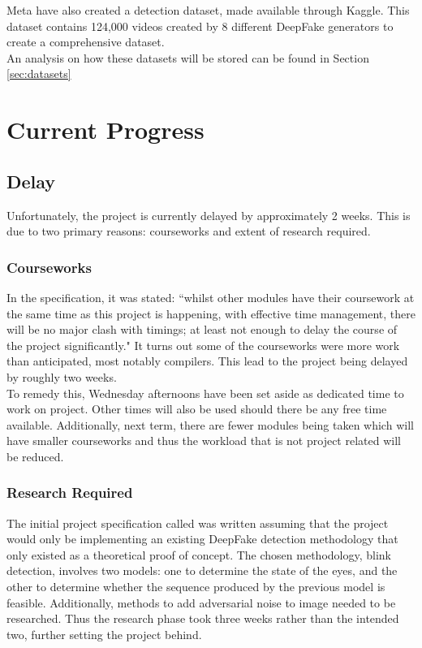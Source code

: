 \documentclass{article}
\begin{document}
Meta have also created a detection dataset\cite{DFDC2020}, made available through Kaggle\cite{kagglemeta}. This dataset contains 124,000 videos created by 8 different DeepFake generators to create a comprehensive dataset.\\

An analysis on how these datasets will be stored can be found in Section \ref{sec:datasets}

\section{Current Progress}

\subsection{Delay}

Unfortunately, the project is currently delayed by approximately 2 weeks. This is due to two primary reasons: courseworks and extent of research required.

\subsubsection{Courseworks}

In the specification, it was stated: ``whilst other modules have their coursework at the same time as this project is happening, with effective time management, there will be no major clash with timings; at least not enough to delay the course of the project significantly." It turns out some of the courseworks were more work than anticipated, most notably compilers. This lead to the project being delayed by roughly two weeks.\\

To remedy this, Wednesday afternoons have been set aside as dedicated time to work on project. Other times will also be used should there be any free time available. Additionally, next term, there are fewer modules being taken which will have smaller courseworks and thus the workload that is not project related will be reduced.

\subsubsection{Research Required}

The initial project specification called was written assuming that the project would only be implementing an existing DeepFake detection methodology that only existed as a theoretical proof of concept. The chosen methodology, blink detection, involves two models: one to determine the state of the eyes, and the other to determine whether the sequence produced by the previous model is feasible. Additionally, methods to add adversarial noise to image needed to be researched. Thus the research phase took three weeks rather than the intended two, further setting the project behind.
\end{document}
